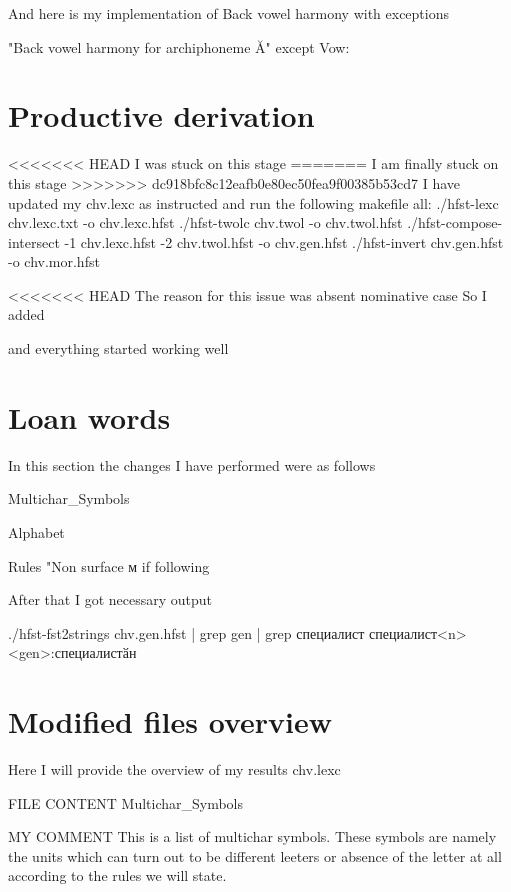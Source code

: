 \documentclass{article}
\begin{document}
And here is my implementation of Back vowel harmony with exceptions

"Back vowel harmony for archiphoneme {Ă}"
        except
                                     Vow: %
                                     
\section{Productive derivation}
<<<<<<< HEAD
I was stuck on this stage
=======
I am finally stuck on this stage
>>>>>>> dc918bfc8c12eafb0e80ec50fea9f00385b53cd7
I have updated my chv.lexc as instructed and run the following makefile
all:
    ./hfst-lexc chv.lexc.txt -o chv.lexc.hfst
    ./hfst-twolc chv.twol -o chv.twol.hfst
    ./hfst-compose-intersect -1 chv.lexc.hfst -2 chv.twol.hfst -o chv.gen.hfst
    ./hfst-invert chv.gen.hfst -o chv.mor.hfst

<<<<<<< HEAD
The reason for this issue was absent nominative case
So I added 


and everything started working well

\section{Loan words}
In this section the changes I have performed were as follows

Multichar_Symbols


Alphabet

Rules
"Non surface {м} if following %

After that I got necessary output

./hfst-fst2strings chv.gen.hfst | grep gen | grep специалист
специалист<n><gen>:специалистӑн

\section{Modified files overview}
Here I will provide the overview of my results
chv.lexc

FILE CONTENT
Multichar_Symbols

MY COMMENT
This is a list of multichar symbols. These symbols are namely the units which can turn out to be different leeters or absence of the letter at all according to the rules we will state. 
\end{document}
